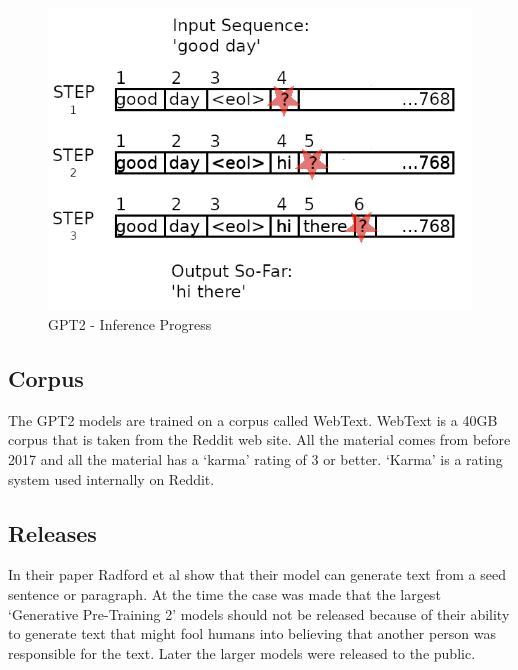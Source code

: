 \begin{figure}[H]
	\begin{center}
		
		
		\includegraphics[scale=2.0]{diagram-inference-01}
	\end{center}
	\caption[Generative Pre-Training 2 Inference]{GPT2 - Inference Progress}
	
	
\end{figure}

\subsection{Corpus}
The GPT2 models are trained on a corpus called WebText. WebText is a 40GB corpus that is taken from the Reddit web site. All the material comes from before 2017 and all the material has a `karma' rating of 3 or better. `Karma' is a rating system used internally on Reddit. 


\subsection{Releases}
In their paper Radford et al \cite{radford2019language} show that their model can generate text from a seed sentence or paragraph. At the time the case was made that the largest `Generative Pre-Training 2' models should not be released because of their ability to generate text that might fool humans into believing that another person was responsible for the text. Later the larger models were released to the public.

